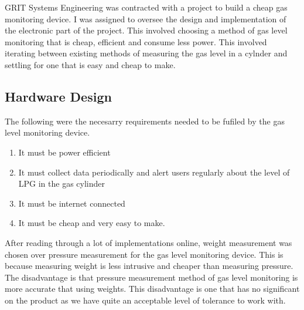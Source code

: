 GRIT Systems Engineering was contracted with a project to build a cheap gas monitoring device. I was assigned to oversee the design and implementation of the electronic part of the project. This involved choosing a method of gas level monitoring that is cheap, efficient and consume less power. This involved iterating between existing methods of measuring the gas level in a cylnder and settling for one that is easy and cheap to make.


\subsection{Hardware Design}
The following were the necesarry requirements needed to be fufiled by the gas level monitoring device.
\begin{enumerate}
\item It must be power efficient
\item It must collect data periodically and alert users regularly about the level of LPG in the gas cylinder
\item It must be internet connected 
\item It must be cheap and very easy to make.
\end{enumerate}

After reading through a lot of implementations online, weight measurement was chosen over pressure measurement for the gas level monitoring device. This is because measuring weight is less intrusive and cheaper than measuring pressure. The disadvantage is that 
pressure measurement method of gas level monitoring is more accurate that using weights. This disadvantage is one that has no significant on the product as we have quite an acceptable level of tolerance to work with. 

